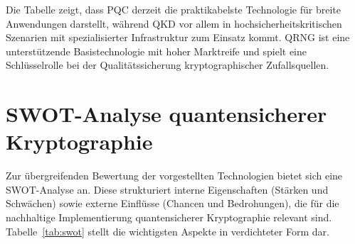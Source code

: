 Die Tabelle zeigt, dass PQC derzeit die praktikabelste Technologie für breite Anwendungen darstellt, während QKD vor allem in hochsicherheitskritischen Szenarien mit spezialisierter Infrastruktur zum Einsatz kommt. QRNG ist eine unterstützende Basistechnologie mit hoher Marktreife und spielt eine Schlüsselrolle bei der Qualitätssicherung kryptographischer Zufallsquellen.

\vspace{2em}

\section{SWOT-Analyse quantensicherer Kryptographie}

Zur übergreifenden Bewertung der vorgestellten Technologien bietet sich eine SWOT-Analyse an. Diese strukturiert interne Eigenschaften (Stärken und Schwächen) sowie externe Einflüsse (Chancen und Bedrohungen), die für die nachhaltige Implementierung quantensicherer Kryptographie relevant sind. Tabelle~\ref{tab:swot} stellt die wichtigsten Aspekte in verdichteter Form dar.

